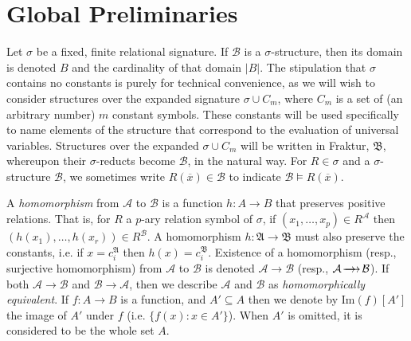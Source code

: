 \documentclass{LMCS}
\newcommand{\surhom}{
  \ensuremath{
      \negthinspace 
      \longrightarrow
      \hspace{-5mm} \rightarrow \hspace{1mm}
  }
}
\begin{document}
\section{Global Preliminaries}

Let $\sigma$ be a fixed, finite relational signature. If $\mathcal{B}$ is a $\sigma$-structure, then its domain is denoted $B$ and the cardinality of that domain $|B|$. The stipulation that $\sigma$ contains no constants is purely for technical convenience, as we will wish to consider structures over the expanded signature $\sigma \cup C_m$, where $C_m$ is a set of (an arbitrary number) $m$ constant symbols. These constants will be used specifically to name elements of the structure that correspond to the evaluation of universal variables. Structures over the expanded $\sigma \cup C_m$ will be written in Fraktur, $\mathfrak{B}$, whereupon their $\sigma$-reducts become $\mathcal{B}$, in the natural way. For $R \in \sigma$ and a $\sigma$-structure $\mathcal{B}$, we sometimes write $R(\overline{x}) \in \mathcal{B}$ to indicate $\mathcal{B} \models R(\overline{x})$.

A \emph{homomorphism} from $\mathcal{A}$ to $\mathcal{B}$ is a function $h:A \rightarrow B$ that preserves positive relations. That is, for $R$ a $p$-ary relation symbol of $\sigma$, if $(x_1,\ldots,x_p) \in R^\mathcal{A}$ then $(h(x_1),\ldots,h(x_r)) \in R^\mathcal{B}$. A homomorphism $h:\mathfrak{A} \rightarrow \mathfrak{B}$ must also preserve the constants, i.e. if $x=c_i^\mathfrak{A}$ then $h(x)=c_i^\mathfrak{B}$.
Existence of a homomorphism (resp., surjective homomorphism) from $\mathcal{A}$ to $\mathcal{B}$ is denoted $\mathcal{A} \rightarrow \mathcal{B}$ (resp., $\mathcal{A} \surhom \mathcal{B}$). If both $\mathcal{A} \rightarrow \mathcal{B}$ and $\mathcal{B} \rightarrow \mathcal{A}$, then we describe $\mathcal{A}$ and $\mathcal{B}$ as \emph{homomorphically equivalent}. If $f:A\rightarrow B$ is a function, and $A'\subseteq A$ then we denote by $\mathrm{Im}(f)[A']$ the image of $A'$ under $f$ (i.e. $\{ f(x) : x \in A' \}$). When $A'$ is omitted, it is considered to be the whole set $A$.
\end{document}
